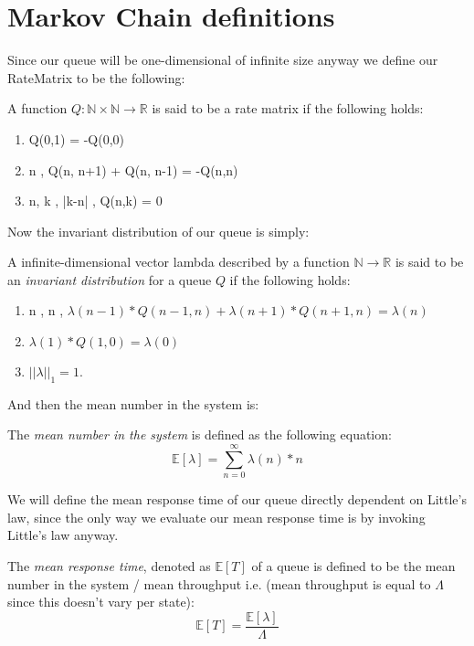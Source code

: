 \section{Markov Chain definitions}

Since our queue will be one-dimensional of infinite size anyway we define our RateMatrix to be the following:
\begin{definition}\label{def:RateMatrix}\leanok
    A function $Q \colon \mathbb{N} \times \mathbb{N} \to \mathbb{R}$ is said to be a rate matrix
    if the following holds:
    \begin{enumerate}
      \item Q(0,1) = -Q(0,0)
      \item \forall n \in {} , Q(n, n+1) + Q(n, n-1) = -Q(n,n)
      \item \forall n, k \in {}, |k-n| , Q(n,k) = 0
    \end{enumerate}
\end{definition}

Now the invariant distribution of our queue is simply:
\begin{definition}\label{def:InvariantDistribution}\leanok
    A infinite-dimensional vector lambda described by a function $\mathbb{N} \to \mathbb{R}$ is said
    to be an \textit{invariant distribution} for a queue $Q$ if the following holds:\
    \begin{enumerate}
        \item \forall n \in {}, n , $\lambda(n-1) * Q(n-1,n) + \lambda(n+1) * Q(n+1,n) = \lambda(n)$
        \item $\lambda(1) * Q(1,0) = \lambda(0)$
        \item $||\lambda||_1 = 1$.
    \end{enumerate}
\end{definition}

And then the mean number in the system is:
\begin{definition}\label{def:MeanLambda}
    The \textit{mean number in the system} is defined as the following equation:
    $$\mathbb{E}[\lambda] = \sum_{n=0}^\infty \lambda(n)*n$$
\end{definition}

We will define the mean response time of our queue directly dependent on Little's law, since the only
way we evaluate our mean response time is by invoking Little's law anyway.
\begin{definition}\label{def:MeanResponseTime}\uses{def:MeanLambda}\leanok
    The \textit{mean response time}, denoted as $\mathbb{E}[T]$ of a queue is defined to be the mean
    number in the system / mean throughput i.e. (mean throughput is equal to $\Lambda$ since this doesn't vary
    per state):
    $$\mathbb{E}[T] = \frac{\mathbb{E}[\lambda]}{\Lambda}$$
\end{definition}

